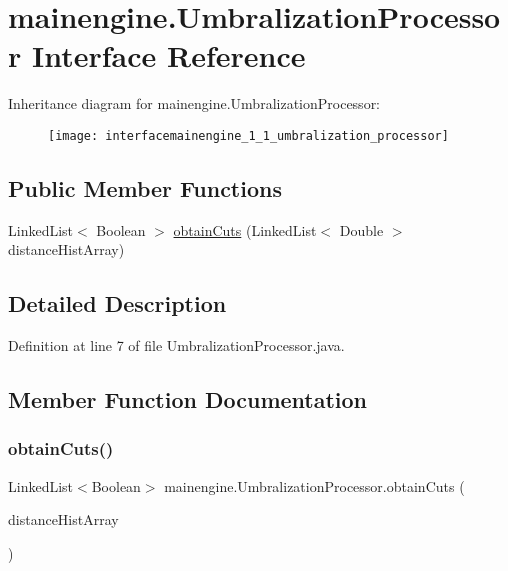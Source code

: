 \hypertarget{interfacemainengine_1_1_umbralization_processor}{}\section{mainengine.\+Umbralization\+Processor Interface Reference}
\label{interfacemainengine_1_1_umbralization_processor}
Inheritance diagram for mainengine.\+Umbralization\+Processor\+:\begin{figure}[H]
\begin{center}
\leavevmode
\texttt{[image: interfacemainengine\_1\_1\_umbralization\_processor]}
\end{center}
\end{figure}
\subsection*{Public Member Functions}
\begin{DoxyCompactItemize}
\item 
Linked\+List$<$ Boolean $>$ \hyperlink{interfacemainengine_1_1_umbralization_processor_ac96dfbad3a28e5332e2cb95ab8996377}{obtain\+Cuts} (Linked\+List$<$ Double $>$ distance\+Hist\+Array)
\end{DoxyCompactItemize}


\subsection{Detailed Description}


Definition at line 7 of file Umbralization\+Processor.\+java.



\subsection{Member Function Documentation}
\hypertarget{interfacemainengine_1_1_umbralization_processor_ac96dfbad3a28e5332e2cb95ab8996377}{}\label{interfacemainengine_1_1_umbralization_processor_ac96dfbad3a28e5332e2cb95ab8996377} 
\subsubsection{\texorpdfstring{obtain\+Cuts()}{obtainCuts()}}
{\footnotesize\ttfamily Linked\+List$<$Boolean$>$ mainengine.\+Umbralization\+Processor.\+obtain\+Cuts (\begin{DoxyParamCaption}\item[{Linked\+List$<$ Double $>$}]{distance\+Hist\+Array }\end{DoxyParamCaption})}



